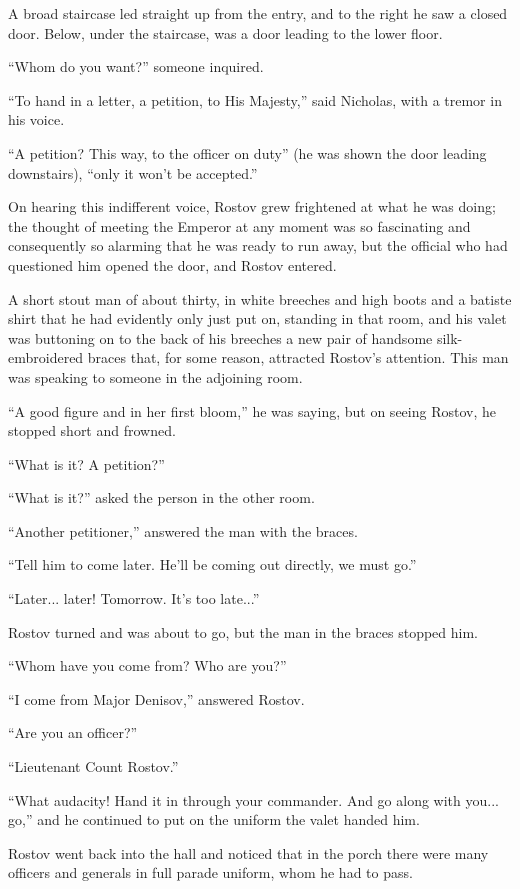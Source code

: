 A broad staircase led straight up from the entry, and to the
right he saw a closed door. Below, under the staircase, was a
door leading to the lower floor.

``Whom do you want?'' someone inquired.

``To hand in a letter, a petition, to His Majesty,'' said
Nicholas, with a tremor in his voice.

``A petition? This way, to the officer on duty'' (he was shown
the door leading downstairs), ``only it won't be accepted.''

On hearing this indifferent voice, Rostov grew frightened at what
he was doing; the thought of meeting the Emperor at any moment
was so fascinating and consequently so alarming that he was ready
to run away, but the official who had questioned him opened the
door, and Rostov entered.

A short stout man of about thirty, in white breeches and high
boots and a batiste shirt that he had evidently only just put on,
standing in that room, and his valet was buttoning on to the back
of his breeches a new pair of handsome silk-embroidered braces
that, for some reason, attracted Rostov's attention. This man was
speaking to someone in the adjoining room.

``A good figure and in her first bloom,'' he was saying, but on
seeing Rostov, he stopped short and frowned.

``What is it? A petition?''

``What is it?'' asked the person in the other room.

``Another petitioner,'' answered the man with the braces.

``Tell him to come later. He'll be coming out directly, we must
go.''

``Later... later! Tomorrow. It's too late...''

Rostov turned and was about to go, but the man in the braces
stopped him.

``Whom have you come from? Who are you?''

``I come from Major Denisov,'' answered Rostov.

``Are you an officer?''

``Lieutenant Count Rostov.''

``What audacity! Hand it in through your commander. And go along
with you... go,'' and he continued to put on the uniform the
valet handed him.

Rostov went back into the hall and noticed that in the porch
there were many officers and generals in full parade uniform,
whom he had to pass.

